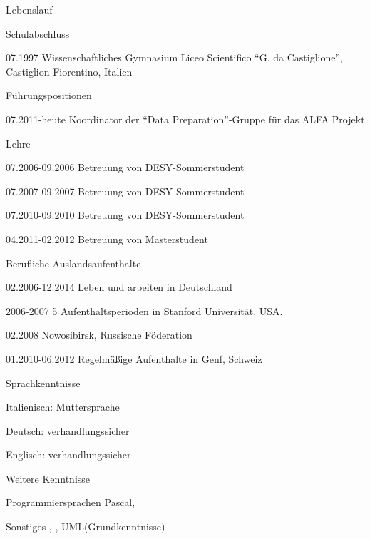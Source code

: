 \documentclass[11pt,a4paper]{scrartcl}
\newcommand{\versal}[1]{\textsf{\textsmaller{\MakeUppercase{\caps{#1}}}}\xspace}
\newcommand*{\ac}[1]{\versal{#1}}
\begin{document}
\begin{cv}{Lebenslauf}
\begin{cvlist}{Schulabschluss}
\item[07.1997] Wissenschaftliches Gymnasium Liceo Scientifico "`G. da
Castiglione"', Castiglion Fiorentino, Italien
\end{cvlist}

\begin{cvlist}{F\"uhrungspositionen}
\item [07.2011-heute] Koordinator der "`Data Preparation"'-Gruppe
f\"ur das ALFA Projekt
\end{cvlist}

\begin{cvlist}{Lehre}
\item [07.2006-09.2006] Betreuung von DESY-Sommerstudent
\item [07.2007-09.2007] Betreuung von DESY-Sommerstudent
\item [07.2010-09.2010] Betreuung von DESY-Sommerstudent
\item [04.2011-02.2012] Betreuung von Masterstudent
\end{cvlist}

\begin{cvlist}{Berufliche Auslandsaufenthalte}
\item [02.2006-12.2014] Leben und arbeiten in Deutschland
\item [2006-2007] 5 Aufenthaltsperioden in Stanford Universit\"at, USA.
\item [02.2008] Nowosibirsk, Russische F\"oderation
\item [01.2010-06.2012] Regelm\"a{\ss}ige Aufenthalte in Genf, Schweiz
\end{cvlist}

\begin{cvlist}{Sprachkenntnisse}
\item Italienisch: Muttersprache
\item Deutsch: verhandlungssicher
\item Englisch: verhandlungssicher
\end{cvlist}

\begin{cvlist}{Weitere \ac{EDV} Kenntnisse}
\item[Programmiersprachen] Pascal, \ac{BASIC}
\item[Sonstiges] \ac{MS OFFICE}, \ac{\LaTeX}, UML(Grundkenntnisse)
\end{cvlist}


\end{cv}
\end{document}
